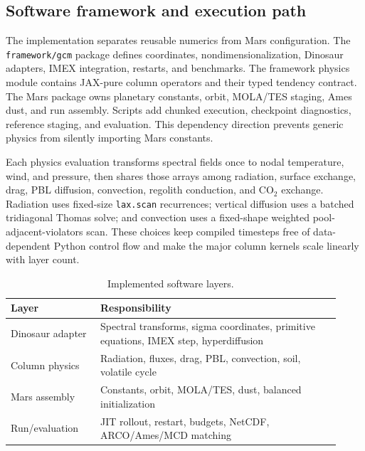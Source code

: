 \documentclass{article}
\begin{document}
\subsection{Software framework and execution path}
The implementation separates reusable numerics from Mars configuration. The
\texttt{framework/gcm} package defines coordinates, nondimensionalization,
Dinosaur adapters, IMEX integration, restarts, and benchmarks. The framework
physics module contains JAX-pure column operators and their typed tendency
contract. The Mars package owns
planetary constants, orbit, MOLA/TES staging, Ames dust, and run assembly.
Scripts add chunked execution, checkpoint diagnostics, reference staging, and
evaluation. This dependency direction prevents generic physics from silently
importing Mars constants.

Each physics evaluation transforms spectral fields once to nodal temperature,
wind, and pressure, then shares those arrays among radiation, surface exchange,
drag, PBL diffusion, convection, regolith conduction, and \(\mathrm{CO_2}\)
exchange. Radiation uses fixed-size \texttt{lax.scan} recurrences; vertical
diffusion uses a batched tridiagonal Thomas solve; and convection uses a
fixed-shape weighted pool-adjacent-violators scan. These choices keep compiled
timesteps free of data-dependent Python control flow and make the major column
kernels scale linearly with layer count.

\begin{table}[t]\centering\small
\caption{Implemented software layers.}\label{tab:framework}
\begin{tabular}{p{0.25\linewidth}p{0.67\linewidth}}\toprule
Layer & Responsibility\\\midrule
Dinosaur adapter & Spectral transforms, sigma coordinates, primitive equations,
IMEX step, hyperdiffusion\\
Column physics & Radiation, fluxes, drag, PBL, convection, soil, volatile cycle\\
Mars assembly & Constants, orbit, MOLA/TES, dust, balanced initialization\\
Run/evaluation & JIT rollout, restart, budgets, NetCDF, ARCO/Ames/MCD matching\\\bottomrule
\end{tabular}
\end{table}
\end{document}

